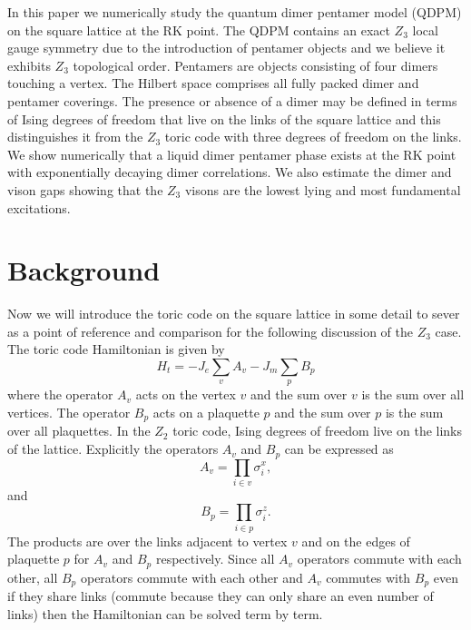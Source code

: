 \documentclass[twocolumn,prb,aps,floatfix,superscriptaddress]{revtex4-1}
\begin{document}
    In this paper we numerically study the quantum dimer pentamer model (QDPM) on the square
    lattice at the RK point.  The QDPM contains an exact $Z_3$ local gauge symmetry due to the
    introduction of pentamer objects and we believe it exhibits $Z_3$ topological order.
    Pentamers are objects consisting of four dimers touching a vertex.  The Hilbert space
    comprises all fully packed dimer and pentamer coverings. The presence or absence of a dimer
    may be defined in terms of Ising degrees of freedom that live on the links of the square
    lattice and this distinguishes it from the $Z_3$ toric code with three degrees of freedom on
    the links. We show numerically that a liquid dimer pentamer phase exists at the RK point
    with exponentially decaying dimer correlations. We also estimate the dimer and vison gaps
    showing that the $Z_3$ visons are the lowest lying and most fundamental excitations.

\section{Background}

    Now we will introduce the toric code on the square lattice in some detail to sever as a point of reference and
    comparison for the following discussion of the $Z_3$ case. The toric code Hamiltonian is given by
    \begin{equation}
        H_t = -J_e\sum_v A_v - J_m\sum_p B_p
        \label{eqn:toric_code_ham}
    \end{equation}
    where the operator $A_v$ acts on the vertex $v$ and the sum over $v$ is the sum over all vertices. 
    The operator $B_p$ acts on a plaquette $p$ and the sum over $p$ is the sum over all
    plaquettes. In the $Z_2$ toric code, Ising degrees of freedom live on the links of the
    lattice. Explicitly the operators $A_v$ and $B_p$ can be expressed as
    \begin{equation}
        A_v = \prod_{i\in v} \sigma^x_i
        ,
    \end{equation}
    and
    \begin{equation}
        B_p = \prod_{i\in p} \sigma^z_i
        .
    \end{equation}
    The products are over the links adjacent to vertex $v$ and on the edges of plaquette $p$ for
    $A_v$ and $B_p$ respectively. Since all $A_v$ operators commute with each other, all
    $B_p$ operators commute with each other and $A_v$ commutes with $B_p$ even if they share
    links (commute because they
    can only share an even number of links) then the Hamiltonian can be solved term by term.
\end{document}
